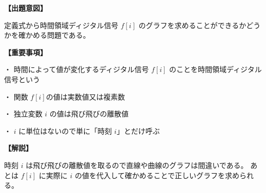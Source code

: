 \noindent \textbf{【出題意図】}

\noindent 定義式から時間領域ディジタル信号 $f[i]$ のグラフを求めることができるかどうかを確かめる問題である。

\vspace{1em}
\noindent \textbf{【重要事項】}

\bigskip
\noindent ・ 時間によって値が変化するディジタル信号 $f[i]$ のことを時間領域ディジタル信号という

\bigskip
\noindent ・ 関数 $f[i]$の値は実数値又は複素数

\bigskip
\noindent ・ 独立変数 $i$ の値は飛び飛びの離散値

\bigskip
\noindent ・ $i$ に単位はないので単に「時刻 $i$」とだけ呼ぶ


\vspace{1em}
\noindent \textbf{【解説】}

\noindent 時刻 $i$ は飛び飛びの離散値を取るので直線や曲線のグラフは間違いである。
あとは $f[i]$ に実際に $i$ の値を代入して確かめることで正しいグラフを求められる。
